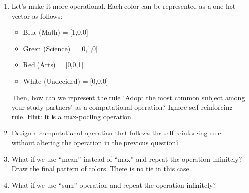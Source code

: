 \documentclass[a4paper, 12pt]{extarticle}
\begin{document}
\begin{enumerate}[resume]

\item Let's make it more operational. Each color can be represented as a one-hot vector as follows:
\begin{multicols}{2}
\begin{itemize}
    \item Blue (Math) = [1,0,0]
    \item Green (Science) = [0,1,0]
\end{itemize}
\columnbreak
\begin{itemize}
    \item Red (Arts) = [0,0,1]
    \item White (Undecided) = [0,0,0]
\end{itemize}
\end{multicols}

Then, how can we represent the rule "Adopt the most common subject among your study partners" as a computational operation? Ignore self-reinforcing rule. Hint: it is a max-pooling operation.


\vspace{10em}
\item Design a computational operation that follows the self-reinforcing rule without altering the operation in the previous question?

\vspace{10em}
\item What if we use ``mean'' instead of ``max'' and repeat the operation infinitely? Draw the final pattern of colors. There is no tie in this case.

\begin{center}
\end{center}

\item What if we use ``sum'' operation and repeat the operation infinitely?
\end{enumerate}
\end{document}

